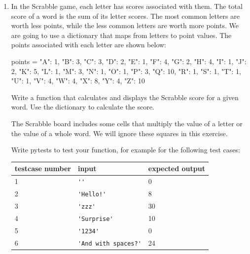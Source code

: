 \documentclass[
  fontsize=10pt,
  a4paper,
]{scrartcl}
\newcommand\solucion[1]{}
\begin{document}
\begin{enumerate}
\begin{small}
\begin{Verbatim}[frame=single]{\em example test run}
  Product        Price
  --------------------
  beer           1.50€
  wine           4.50€
  seed pack      1.00€
  fruit          8.00€
  --------------------
  Total         15.00€
\end{Verbatim}
\end{small}

You can assume that the user only adds 1 sample of each product. Your tests can be run through the shell manually.

\solucion{
basket = {}
more = 'Si'
while more == 'Si':
    item = input('Enter a product: ')
    price = float(input('Enter its price: '))
    basket[item] = price
    more = input('Do you want to continue? (Y/N): ')
cost = 0
print('Shopping list')
for item, price in basket.items():
    print(item, '\t', price)
    cost += price
print('Total: ', price)
}


\item In the Scrabble game, each letter has scores associated with them. The total score
of a word is the sum of its letter scores. The most common letters are worth less points, while the less common letters are worth more points. We are going to use a dictionary that maps from letters to point values. The points associated with each letter are shown below:

\begin{python}
points = {"A": 1, "B": 3, "C": 3, "D": 2, "E": 1, "F": 4,
          "G": 2, "H": 4, "I": 1, "J": 2, "K": 5, "L": 1,
          "M": 3, "N": 1, "O": 1, "P": 3, "Q": 10, "R": 1,
          "S": 1, "T": 1, "U": 1, "V": 4, "W": 4, "X": 8,
          "Y": 4, "Z": 10
          }
\end{python}

Write a function that calculates and displays the Scrabble score for a given word.
Use the dictionary to calculate the score.

The Scrabble board includes some cells that multiply the value of a letter or the value of a whole word. We will ignore these squares in this exercise.

Write pytests to test your function, for example for the following test cases:

\begin{longtable}{|l|l|l|}
\hline
testcase number & input & expected output   \\ \hline
1  &  \verb|''|  & 0 \\ 
2  &  \verb|'Hello!'|    & 8\\
3 &  \verb|'zzz'|    &  30\\
4 &  \verb|'Surprise'|     & 10 \\
5 & \verb|'1234'|  & 0 \\
6 & \verb|'And with spaces?'|  & 24 \\
\hline
\end{longtable}



\end{enumerate}
\end{document}
